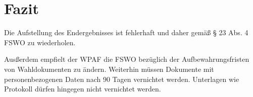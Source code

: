 \documentclass[a4paper]{scrartcl}
\begin{document}


\section{Fazit}





Die Aufstellung des Endergebnisses ist fehlerhaft und daher gemäß § 23 Abs. 4 FSWO zu wiederholen.

Ausßerdem empfielt der WPAF die FSWO bezüglich der Aufbewahrungsfristen von Wahldokumenten zu ändern.
Weiterhin müssen Dokumente mit personenbezogenen Daten nach 90 Tagen vernichtet werden.
Unterlagen wie Protokoll dürfen hingegen nicht vernichtet werden.
\end{document}
